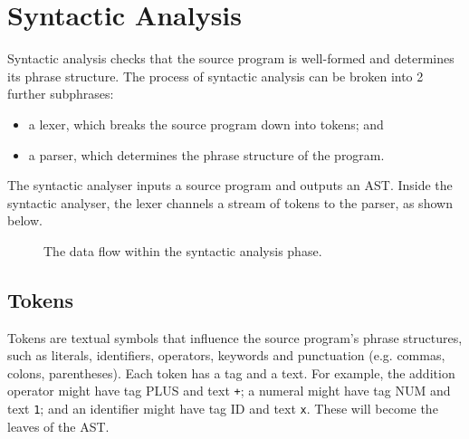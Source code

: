 \documentclass[a4paper, openany]{memoir}
\begin{document}
\newpage

\section{Syntactic Analysis}
Syntactic analysis checks that the source program is well-formed and determines its phrase structure. The process of syntactic analysis can be broken into 2 further subphrases:
\begin{itemize}
    \item a lexer, which breaks the source program down into tokens; and
    \item a parser, which determines the phrase structure of the program.
\end{itemize}

The syntactic analyser inputs a source program and outputs an AST. Inside the syntactic analyser, the lexer channels a stream of tokens to the parser, as shown below.
\begin{figure}[H]
    \centering
    \caption{The data flow within the syntactic analysis phase.}
\end{figure}

\subsection{Tokens}
Tokens are textual symbols that influence the source program's phrase structures, such as literals, identifiers, operators, keywords and punctuation (e.g. commas, colons, parentheses). Each token has a tag and a text. For example, the addition operator might have tag PLUS and text \texttt{+}; a numeral might have tag NUM and text \texttt{1}; and an identifier might have tag ID and text \texttt{x}. These will become the leaves of the AST.
\end{document}
